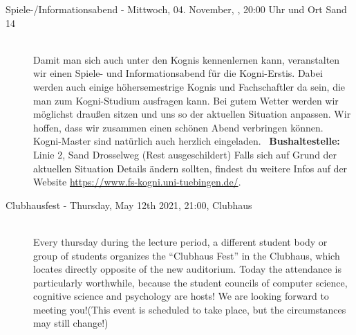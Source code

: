 \begin{description}
\fi

\ifkogwiss
    \item[Spiele-/Informationsabend - Mittwoch, 04. November, \YEAR, 20:00 Uhr und Ort Sand 14]\ \\
         Damit man sich auch unter den Kognis kennenlernen kann, veranstalten wir einen Spiele- und Informationsabend für die Kogni-Erstis. Dabei werden auch einige höhersemestrige Kognis und Fachschaftler da sein, die man zum Kogni-Studium ausfragen kann. Bei gutem Wetter werden wir möglichst draußen sitzen und uns so der aktuellen Situation anpassen. Wir hoffen, dass wir zusammen einen schönen Abend verbringen können. Kogni-Master sind natürlich auch herzlich eingeladen.
	~\textbf{Bushaltestelle:} Linie 2, Sand Drosselweg (Rest ausgeschildert)
	Falls sich auf Grund der aktuellen Situation Details ändern sollten, findest du weitere Infos auf der Website \url{https://www.fs-kogni.uni-tuebingen.de/}.
\fi




\ifml
    \item[Clubhausfest - Thursday, May 12th 2021, 21:00, Clubhaus]\ \\
        Every thursday during the lecture period, a different student body or group of students organizes the "`Clubhaus Fest"' in the Clubhaus, which locates directly opposite of the new auditorium. Today the attendance is particularly worthwhile, because the student councils of computer science, cognitive science and psychology are hosts! We are looking forward to meeting you!(This event is scheduled to take place, but the circumstances may still change!)


\end{description}
